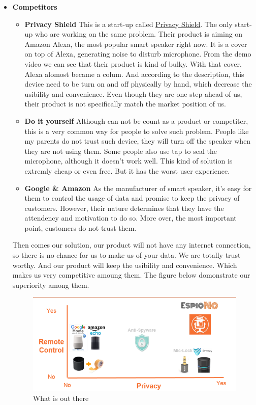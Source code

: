 \documentclass[12pt,twoside]{article}
\begin{document}
\begin{itemize}
\item \textbf{Competitors}\\
\begin{itemize}
    \item \textbf{Privacy Shield} This is a start-up called \href{https://getprivacyshield.co/}{Privacy Shield}. The only start-up who are working on the same problem.
    Their product is aiming on Amazon Alexa, the most popular smart speaker right now. It is a cover on top of Alexa, generating noise to disturb microphone. From the 
    demo video we can see that their product is kind of bulky. With that cover, Alexa alomost became a colum. And according to the description, this device need to be 
    turn on and off physically by hand, which decrease the usibility and convenience. Even though they are one step ahead of us, their product is not specifically match 
    the market position of us.
    \item \textbf{Do it yourself} Although can not be count as a product or competiter, this is a very common way for people to solve such problem. People like my parents
    do not trust such device, they will turn off the speaker when they are not using them. Some people also use tap to seal the microphone, although it doesn't work well.
    This kind of solution is extremly cheap or even free. But it has the worst user experience.
    \item \textbf{Google \& Amazon} As the manufacturer of smart speaker, it's easy for them to control the usage of data and promise to keep the privacy of customers. 
    However, their nature determines that they have the attendency and motivation to do so. More over, the most important point, customers do not trust them.
\end{itemize}
Then comes our solution, our product will not have any internet connection, so there is no chance for us to make us of your data. We are totally trust worthy. And our 
product will keep the usibility and convenience. Which makes us very competitive amoung them. The figure below domonstrate our superiority among them.

\begin{figure}[!htb]
\centering
\includegraphics[width=\textwidth]{whatsoutthere.png}
\caption{What is out there}
\label{fig:What is out there}
\end{figure}

\end{itemize}
\end{document}
